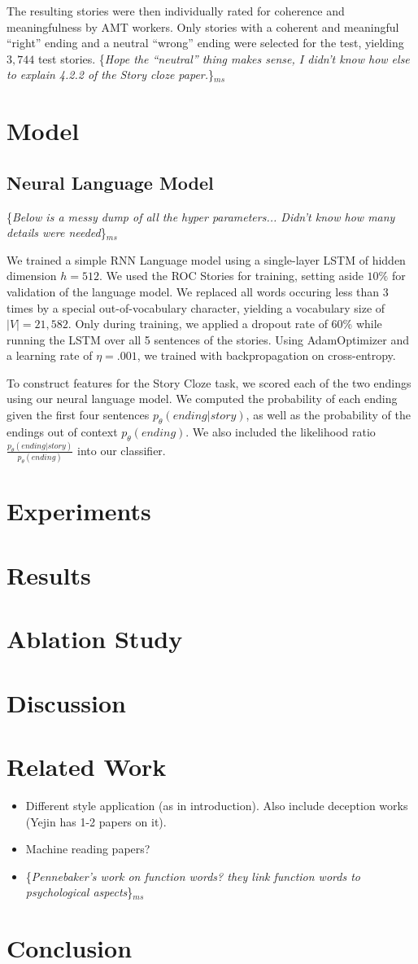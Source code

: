 \documentclass[11pt,a4paper]{article}
\newcommand{\isection}[2]{\section{#1}\label{ssec:#2}}
\newcommand{\isectionb}[1]{\section{#1}\label{ssec:#1}}
\newcommand{\ms}[1]{{\color{cyan}\{\textit{#1}\}$_{ms}$}}
\begin{document}
The resulting stories were then individually rated for coherence and meaningfulness by AMT workers. Only stories with a coherent and meaningful ``right'' ending and a neutral ``wrong'' ending were selected for the test, yielding $3,744$ test stories. \ms{Hope the ``neutral'' thing makes sense, I didn't know how else to explain 4.2.2 of the Story cloze paper.}

\isectionb{Model}

\subsection{Neural Language Model}
\ms{Below is a messy dump of all the hyper parameters... Didn't know how many details were needed}

We trained a simple RNN Language model \cite{mikolov2010recurrent} using a single-layer LSTM \cite{hochreiter1997long} of hidden dimension $h=512$.
We used the ROC Stories for training, setting aside $10\%$ for validation of the language model. We replaced all words occuring less than 3 times by a special out-of-vocabulary character, yielding a vocabulary size of $|V|=21,582$.
Only during training, we applied a dropout rate of 60\% while running the LSTM over all 5 sentences of the stories. Using AdamOptimizer \cite{kingma2014adam} and a learning rate of $\eta=.001$, we trained with backpropagation on cross-entropy. %

To construct features for the Story Cloze task, we scored each of the two endings using our neural language model. We computed the probability of each ending given the first four sentences $p_\theta(ending|story)$, as well as the probability of the endings out of context $p_\theta(ending)$. We also included the likelihood ratio $\frac{p_\theta(ending|story)}{p_\theta(ending)}$ into our classifier.
\isectionb{Experiments}

\isectionb{Results}

\isection{Ablation Study}{Ablation}

\isectionb{Discussion}

\isection{Related Work}{Related}

\begin{itemize}
\item Different style application (as in introduction). Also include deception works (Yejin has 1-2 papers on it). 
\item Machine reading papers? 
\item \ms{Pennebaker's work on function words? they link function words to psychological aspects}
\end{itemize}


\isectionb{Conclusion}




%
%

\newpage


\end{document}

